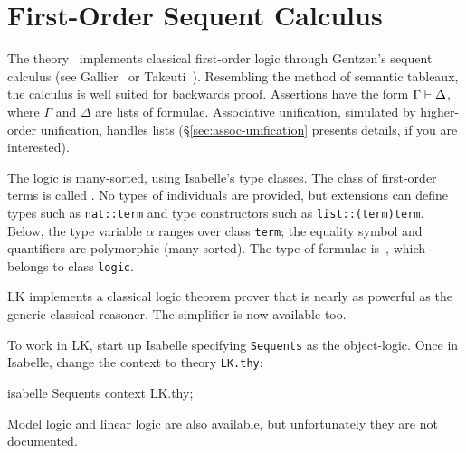 \chapter{First-Order Sequent Calculus}

The theory~ implements classical first-order logic through Gentzen's
sequent calculus (see Gallier~\cite{gallier86} or Takeuti~\cite{takeuti87}).
Resembling the method of semantic tableaux, the calculus is well suited for
backwards proof.  Assertions have the form \(\Gamma\vdash \Delta\), where
\(\Gamma\) and \(\Delta\) are lists of formulae.  Associative unification,
simulated by higher-order unification, handles lists
(\S\ref{sec:assoc-unification} presents details, if you are interested).

The logic is many-sorted, using Isabelle's type classes.  The class of
first-order terms is called .  No types of individuals are
provided, but extensions can define types such as {\tt nat::term} and type
constructors such as {\tt list::(term)term}.  Below, the type variable
$\alpha$ ranges over class {\tt term}; the equality symbol and quantifiers
are polymorphic (many-sorted).  The type of formulae is~, which
belongs to class {\tt logic}.

LK implements a classical logic theorem prover that is nearly as powerful as
the generic classical reasoner.  The simplifier is now available too.

To work in LK, start up Isabelle specifying  \texttt{Sequents} as the
object-logic.  Once in Isabelle, change the context to theory \texttt{LK.thy}:
\begin{ttbox}
isabelle Sequents
context LK.thy;
\end{ttbox}
Model logic and linear logic are also available, but unfortunately they are
not documented.


